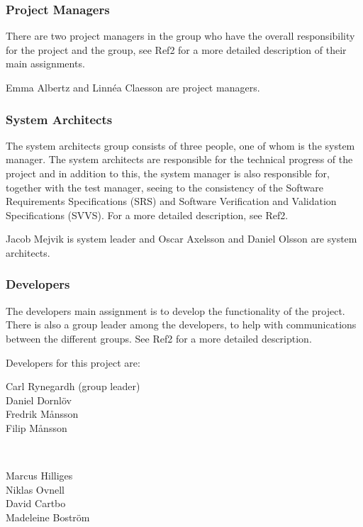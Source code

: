 \documentclass[a4paper]{article}
\begin{document}
\subsubsection{Project Managers}
There are two project managers in the group who have the overall responsibility for the project and the group, see Ref2 for a more detailed description of their main assignments.

Emma Albertz and Linnéa Claesson are project managers.

\subsubsection{System Architects}
The system architects group consists of three people, one of whom is the system manager. The system architects are responsible for the technical progress of the project and in addition to this, the system manager is also responsible for, together with the test manager, seeing to the consistency of the Software Requirements Specifications (SRS) and Software Verification and Validation Specifications (SVVS). For a more detailed description, see Ref2.

Jacob Mejvik is system leader and Oscar Axelsson and Daniel Olsson are system architects.

\subsubsection{Developers}
The developers main assignment is to develop the functionality of the project. There is also a group leader among the developers, to help with communications between the different groups. See Ref2 for a more detailed description.

Developers for this project are: 

\begin{minipage}{0.4\textwidth}
\begin{flushleft} 
Carl Rynegardh (group leader)\\
Daniel Dornlöv\\
Fredrik Månsson\\
Filip Månsson
\end{flushleft}
\end{minipage}
~
\begin{minipage}{0.3\textwidth}
\begin{flushleft}
Marcus Hilliges\\
Niklas Ovnell\\
David Cartbo\\
Madeleine Boström
\end{flushleft}
\end{minipage}\\
\end{document}

